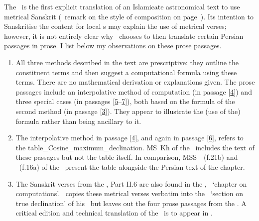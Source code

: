The \Siddhantasindhu\ is the first  explicit translation of an Islamicate astronomical text to use metrical Sanskrit (\vid\ remark on the style of composition on page~\pageref{prose_poetry_mixed_form}). Its intention to Sanskritise the content for local \jyotisa s may explain the use of metrical verses; however, it is not entirely clear why \Nityananda\ chooses to then translate certain Persian passages in prose. I list below my observations on these prose passages. 
\begin{enumerate}[topsep=0pt]
    \item All three methods described in the text are prescriptive: they outline the constituent terms and then suggest a computational formula using these terms. There are no mathematical derivation or explanations given. The prose passages include an interpolative method of computation (in passage [\hyperlink{Spass4}{4}]) and three special cases (in passages  [\hyperlink{Spass5}{5}--\hyperlink{Spass7}{7}]), both based on the formula of the second method (in passage [\hyperlink{Spass3}{3}]). They appear to illustrate the (use of the) formula rather than being ancillary to it.
    \item The interpolative method in passage [\hyperlink{Spass4}{4}], and again in passage [\hyperlink{Spass6}{6}], refers to the \gls{table_Cosine_maximum_declination}. MS~Kh of the \Siddhantasindhu\ includes the text of these passages but not the table itself. In comparison, MSS~\SjA\ (f.\thinspace 21b) and \SjB\ (f.\thinspace 16a) of the \ZijiShahJahani\ present the table alongside the Persian text of the chapter.
    \item The Sanskrit verses from the \Siddhantasindhu, Part II.6 are also found in the \Sarvasiddhantaraja, \ganitadhyaya\ `chapter on computations'. \Nityananda\ copies these metrical verses verbatim into the \spastakrantyadhikara\ `section on true declination' of his \Sarvasiddhantaraja\ but leaves out the four prose passages from the \Siddhantasindhu. A critical edition and technical translation of the \spastakrantyadhikara\ is to appear in \textcite[forthcoming]{MisraTD}. 
\end{enumerate}
 
